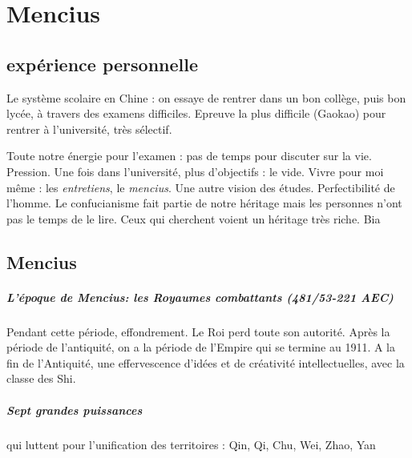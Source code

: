 \chapter{Mencius}
\section{expérience personnelle}

\begin{singlequote}

Le système scolaire en Chine : on essaye de rentrer dans un bon collège, puis bon lycée, à travers des examens difficiles. Epreuve la plus difficile (Gaokao) pour rentrer à l'université, très sélectif.

Toute notre énergie pour l'examen : pas de temps pour discuter sur la vie. Pression. Une fois dans l'université, plus d'objectifs : le vide. Vivre pour moi même : les \textit{entretiens}, le \textit{mencius}. Une autre vision des études. Perfectibilité de l'homme.  Le confucianisme fait partie de notre héritage mais les personnes n'ont pas le temps de le lire. Ceux qui cherchent voient un héritage très riche.    Bia 
\end{singlequote}


\section{Mencius}

\paragraph{L’époque de Mencius: les Royaumes combattants (481/53-221 AEC)} Pendant cette période, effondrement. Le Roi perd toute son autorité. Après la période de l'antiquité, on a la période de l'Empire qui se termine au 1911. A la fin de l'Antiquité, une effervescence d'idées et de créativité intellectuelles, avec la classe des Shi.

\paragraph{Sept grandes puissances} qui luttent pour l’unification des territoires :
Qin, Qi, Chu, Wei, Zhao, Yan


